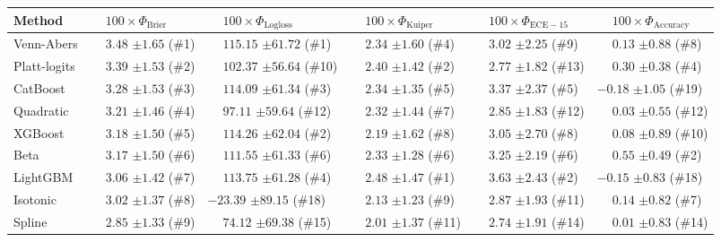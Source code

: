 \begin{tabular}{llllll}
\toprule
Method & $\phantom{-} 100 \times \Phi_\mathrm{Brier}$ & $\phantom{-} 100 \times \Phi_\mathrm{Logloss}$ & $\phantom{-} 100 \times \Phi_\mathrm{Kuiper}$ & $\phantom{-} 100 \times \Phi_\mathrm{ECE-15}$ & $\phantom{-} 100 \times \Phi_\mathrm{Accuracy}$ \\
\midrule
Venn-Abers & $\phantom{-}3.48$ {\tiny $\pm 1.65$} (\#1) & $\phantom{-}115.15$ {\tiny $\pm 61.72$} (\#1) & $\phantom{-}2.34$ {\tiny $\pm 1.60$} (\#4) & $\phantom{-}3.02$ {\tiny $\pm 2.25$} (\#9) & $\phantom{-}0.13$ {\tiny $\pm 0.88$} (\#8) \\
Platt-logits & $\phantom{-}3.39$ {\tiny $\pm 1.53$} (\#2) & $\phantom{-}102.37$ {\tiny $\pm 56.64$} (\#10) & $\phantom{-}2.40$ {\tiny $\pm 1.42$} (\#2) & $\phantom{-}2.77$ {\tiny $\pm 1.82$} (\#13) & $\phantom{-}0.30$ {\tiny $\pm 0.38$} (\#4) \\
CatBoost & $\phantom{-}3.28$ {\tiny $\pm 1.53$} (\#3) & $\phantom{-}114.09$ {\tiny $\pm 61.34$} (\#3) & $\phantom{-}2.34$ {\tiny $\pm 1.35$} (\#5) & $\phantom{-}3.37$ {\tiny $\pm 2.37$} (\#5) & $-0.18$ {\tiny $\pm 1.05$} (\#19) \\
Quadratic & $\phantom{-}3.21$ {\tiny $\pm 1.46$} (\#4) & $\phantom{-}97.11$ {\tiny $\pm 59.64$} (\#12) & $\phantom{-}2.32$ {\tiny $\pm 1.44$} (\#7) & $\phantom{-}2.85$ {\tiny $\pm 1.83$} (\#12) & $\phantom{-}0.03$ {\tiny $\pm 0.55$} (\#12) \\
XGBoost & $\phantom{-}3.18$ {\tiny $\pm 1.50$} (\#5) & $\phantom{-}114.26$ {\tiny $\pm 62.04$} (\#2) & $\phantom{-}2.19$ {\tiny $\pm 1.62$} (\#8) & $\phantom{-}3.05$ {\tiny $\pm 2.70$} (\#8) & $\phantom{-}0.08$ {\tiny $\pm 0.89$} (\#10) \\
Beta & $\phantom{-}3.17$ {\tiny $\pm 1.50$} (\#6) & $\phantom{-}111.55$ {\tiny $\pm 61.33$} (\#6) & $\phantom{-}2.33$ {\tiny $\pm 1.28$} (\#6) & $\phantom{-}3.25$ {\tiny $\pm 2.19$} (\#6) & $\phantom{-}0.55$ {\tiny $\pm 0.49$} (\#2) \\
LightGBM & $\phantom{-}3.06$ {\tiny $\pm 1.42$} (\#7) & $\phantom{-}113.75$ {\tiny $\pm 61.28$} (\#4) & $\phantom{-}2.48$ {\tiny $\pm 1.47$} (\#1) & $\phantom{-}3.63$ {\tiny $\pm 2.43$} (\#2) & $-0.15$ {\tiny $\pm 0.83$} (\#18) \\
Isotonic & $\phantom{-}3.02$ {\tiny $\pm 1.37$} (\#8) & $-23.39$ {\tiny $\pm 89.15$} (\#18) & $\phantom{-}2.13$ {\tiny $\pm 1.23$} (\#9) & $\phantom{-}2.87$ {\tiny $\pm 1.93$} (\#11) & $\phantom{-}0.14$ {\tiny $\pm 0.82$} (\#7) \\
Spline & $\phantom{-}2.85$ {\tiny $\pm 1.33$} (\#9) & $\phantom{-}74.12$ {\tiny $\pm 69.38$} (\#15) & $\phantom{-}2.01$ {\tiny $\pm 1.37$} (\#11) & $\phantom{-}2.74$ {\tiny $\pm 1.91$} (\#14) & $\phantom{-}0.01$ {\tiny $\pm 0.83$} (\#14) \\

\end{tabular}

